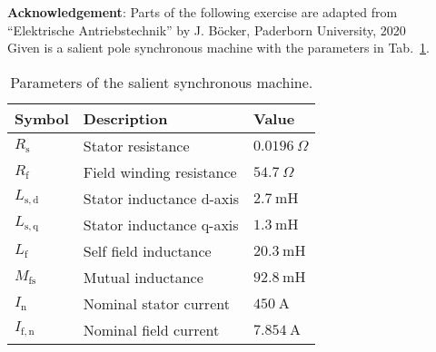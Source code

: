 

\normalsize{\textbf{Acknowledgement}: Parts of the following exercise are adapted from ``Elektrische Antriebstechnik'' by J. Böcker, Paderborn University, 2020
}\\




Given is a salient pole synchronous machine with the parameters in Tab.~\ref{tab:para_salientSynchonousMachine}.

\begin{table}[htb]
    \caption{Parameters of the salient synchronous machine.}
    \centering
    \begin{tabular}{lll}\toprule
    Symbol  & Description       & Value \\
    \midrule
    $R_{\mathrm{s}}$    & Stator resistance         & $\SI{0.0196}{\Omega}$ \\
    $R_{\mathrm{f}}$    & Field winding resistance  & $\SI{54.7}{\Omega}$ \\
    $L_{\mathrm{s,d}}$    & Stator inductance d-axis  & $\SI{2.7}{\milli\henry}$ \\
    $L_{\mathrm{s,q}}$    & Stator inductance q-axis  & $\SI{1.3}{\milli\henry}$ \\
    $L_{\mathrm{f}}$    & Self field inductance     & $\SI{20.3}{\milli\henry}$ \\
    $M_{\mathrm{fs}}$   & Mutual inductance         & $\SI{92.8}{\milli\henry}$ \\
    $I_{\mathrm{n}}$    & Nominal stator current    & $\SI{450}{\ampere}$ \\
    $I_{\mathrm{f,n}}$  & Nominal field current     & $\SI{7.854}{\ampere}$ \\
    \bottomrule
    \end{tabular}
    \label{tab:para_salientSynchonousMachine}
\end{table}








